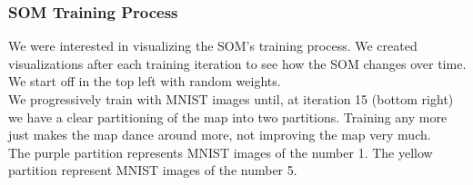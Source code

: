 \documentclass[11pt]{article}
\begin{document}
\subsubsection{SOM Training Process}\label{som-training-process}

We were interested in visualizing the SOM's training process. We created
visualizations after each training iteration to see how the SOM changes
over time. We start off in the top left with random weights.
\\

We progressively train with MNIST images until, at iteration 15 (bottom
right) we have a clear partitioning of the map into two partitions.
Training any more just makes the map dance around more, not improving
the map very much.
\\

The purple partition represents MNIST images of the number 1. The yellow
partition represent MNIST images of the number 5.
\end{document}
